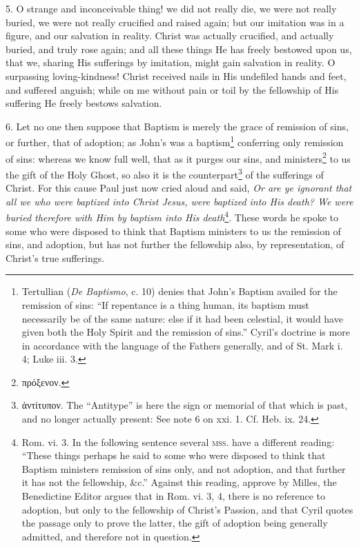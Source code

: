 5. O strange and inconceivable thing! we did not really die, we were not really buried, we were not really crucified and raised again; but our imitation was in a figure, and our salvation in reality. Christ was actually crucified, and actually buried, and truly rose again; and all these things He has freely bestowed upon us, that we, sharing His sufferings by imitation, might gain salvation in reality. O surpassing loving-kindness! Christ received nails in His undefiled hands and feet, and suffered anguish; while on me without pain or toil by the fellowship of His suffering He freely bestows salvation.

6. Let no one then suppose that Baptism is merely the grace of remission of sins, or further, that of adoption; as John’s was a baptism\footnote{Tertullian (\emph{De Baptismo}, c. 10) denies that John’s Baptism availed for the remission of sins: “If repentance is a thing human, its baptism must necessarily be of the same nature: else if it had been celestial, it would have given both the Holy Spirit and the remission of sins.” Cyril’s doctrine is more in accordance with the language of the Fathers generally, and of St. Mark i. 4; Luke iii. 3.} conferring only remission of sins: whereas we know full well, that as it purges our sins, and ministers\footnote{\textgreek{πρόξενον}.} to us the gift of the Holy Ghost, so also it is the counterpart\footnote{\textgreek{ἀντίτυπον}. The “Antitype” is here the sign or memorial of that which is past, and no longer actually present: See note 6 on xxi. 1. Cf. Heb. ix. 24.} of the sufferings of Christ. For this cause Paul just now cried aloud and said, \emph{Or are ye ignorant that all we who were baptized into Christ Jesus, were baptized into His death? We were buried therefore with Him by baptism into His death}\footnote{Rom. vi. 3. In the following sentence several \textsc{mss.} have a different reading: “These things perhaps he said to some who were disposed to think that Baptism ministers remission of sins only, and not adoption, and that further it has not the fellowship, \&c.” Against this reading, approve by Milles, the Benedictine Editor argues that in Rom. vi. 3, 4, there is no reference to adoption, but only to the fellowship of Christ’s Passion, and that Cyril quotes the passage only to prove the latter, the gift of adoption being generally admitted, and therefore not in question.}. These words he spoke to some who were disposed to think that Baptism ministers to us the remission of sins, and adoption, but has not further the fellowship also, by representation, of Christ’s true sufferings.

